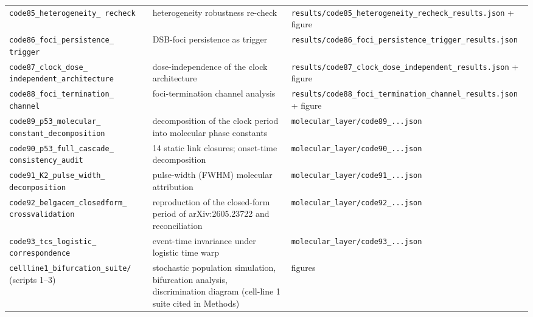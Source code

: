 \documentclass[11pt]{article}
\begin{document}
\begin{longtable}{p{4.6cm} p{6.6cm} p{4.6cm}}
\texttt{code85\_\allowbreak{}heterogeneity\_\allowbreak{} recheck} & heterogeneity robustness re-check & \texttt{results/code85\_\allowbreak{}heterogeneity\_\allowbreak{}recheck\_\allowbreak{}results.json} + figure \\
\texttt{code86\_\allowbreak{}foci\_\allowbreak{}persistence\_\allowbreak{} trigger} & DSB-foci persistence as trigger & \texttt{results/code86\_\allowbreak{}foci\_\allowbreak{}persistence\_\allowbreak{}trigger\_\allowbreak{}results.json} \\
\texttt{code87\_\allowbreak{}clock\_\allowbreak{}dose\_\allowbreak{} independent\_\allowbreak{}architecture} & dose-independence of the clock architecture & \texttt{results/code87\_\allowbreak{}clock\_\allowbreak{}dose\_\allowbreak{}independent\_\allowbreak{}results.json} + figure \\
\texttt{code88\_\allowbreak{}foci\_\allowbreak{}termination\_\allowbreak{} channel} & foci-termination channel analysis & \texttt{results/code88\_\allowbreak{}foci\_\allowbreak{}termination\_\allowbreak{}channel\_\allowbreak{}results.json} + figure \\
\texttt{code89\_\allowbreak{}p53\_\allowbreak{}molecular\_\allowbreak{} constant\_\allowbreak{}decomposition} & decomposition of the clock period into molecular phase constants & \texttt{molecular\_\allowbreak{}layer/code89\_\allowbreak{}...json} \\
\texttt{code90\_\allowbreak{}p53\_\allowbreak{}full\_\allowbreak{}cascade\_\allowbreak{} consistency\_\allowbreak{}audit} & 14 static link closures; onset-time decomposition & \texttt{molecular\_\allowbreak{}layer/code90\_\allowbreak{}...json} \\
\texttt{code91\_\allowbreak{}K2\_\allowbreak{}pulse\_\allowbreak{}width\_\allowbreak{} decomposition} & pulse-width (FWHM) molecular attribution & \texttt{molecular\_\allowbreak{}layer/code91\_\allowbreak{}...json} \\
\texttt{code92\_\allowbreak{}belgacem\_\allowbreak{}closedform\_\allowbreak{} crossvalidation} & reproduction of the closed-form period of arXiv:2605.23722 and reconciliation & \texttt{molecular\_\allowbreak{}layer/code92\_\allowbreak{}...json} \\
\texttt{code93\_\allowbreak{}tcs\_\allowbreak{}logistic\_\allowbreak{} correspondence} & event-time invariance under logistic time warp & \texttt{molecular\_\allowbreak{}layer/code93\_\allowbreak{}...json} \\
\texttt{cellline1\_bifurcation}\allowbreak\texttt{\_suite/} (scripts 1--3) & stochastic population simulation, bifurcation analysis, discrimination diagram (cell-line 1 suite cited in Methods) & figures \\

\end{longtable}
\end{document}
